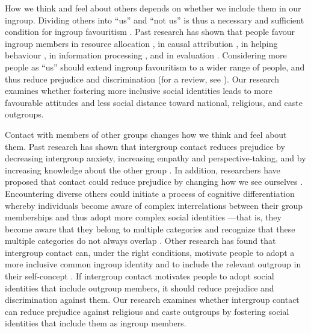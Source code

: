 \documentclass[12pt, a4paper]{article}
\begin{document}
How we think and feel about others depends on whether we include them in our ingroup. Dividing others into ``us'' and ``not us'' is thus a necessary and sufficient condition for ingroup favouritism \cite{tajfel_human_1981}. Past research has shown that people favour ingroup members in resource allocation \cite{tajfel_social_1971}, in causal attribution \cite{hewstone_ultimate_1990, taylor_ethnocentrism_1974}, in helping behaviour \cite{levine_identity_2005}, in information processing \cite{bavel_neural_2008}, and in evaluation \cite{otten_evidence_2000}. Considering more people as ``us'' should extend ingroup favouritism to a wider range of people, and thus reduce prejudice and discrimination (for a review, see ). Our research examines whether fostering more inclusive social identities leads to more favourable attitudes and less social distance toward national, religious, and caste outgroups.

Contact with members of other groups changes how we think and feel about them. Past research has shown that intergroup contact reduces prejudice \cite{pettigrew_meta_2006} by decreasing intergroup anxiety, increasing empathy and perspective-taking, and by increasing knowledge about the other group \cite{pettigrew_how_2008}. In addition, researchers have proposed that contact could reduce prejudice by changing how we see ourselves
\cite{pettigrew_generalized_1997, pettigrew_intergroup_1998}. Encountering diverse others could initiate a process of cognitive differentiation \cite{schmid_social_2011} whereby individuals become aware of complex interrelations between their group memberships and thus adopt more complex social identities \cite{schmid_antecedents_2009}---that is, they become aware that they belong to multiple categories and recognize that these multiple categories do not always overlap \cite{roccas_social_2002}. Other research has found that intergroup contact can, under the right conditions, motivate people to adopt a more inclusive common ingroup identity \cite{gaertner_contact_1994} and to include the relevant outgroup in their self-concept \cite{page_understanding_2010}. If intergroup contact motivates people to adopt social identities that include outgroup members, it should reduce prejudice and discrimination against them. Our research examines whether intergroup contact can reduce prejudice against religious and caste outgroups by fostering social identities that include them as ingroup members.
\end{document}
